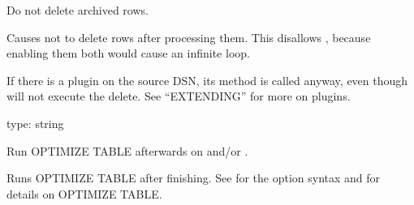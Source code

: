 \documentclass[letterpaper,10pt,english]{sphinxmanual}
\begin{document}

\begin{fulllineitems}
\label{\detokenize{mariadb-archiver:cmdoption-mariadb-archiver-no-delete}}
Do not delete archived rows.

Causes  not to delete rows after processing them.  This disallows
{\hyperref[\detokenize{mariadb-archiver:cmdoption-mariadb-archiver-no-ascend}]{}}, because enabling them both would cause an infinite loop.

If there is a plugin on the source DSN, its  method is called
anyway, even though  will not execute the delete.  See
“EXTENDING” for more on plugins.

\end{fulllineitems}


\begin{fulllineitems}
\label{\detokenize{mariadb-archiver:cmdoption-mariadb-archiver-optimize}}
type: string

Run OPTIMIZE TABLE afterwards on {\hyperref[\detokenize{mariadb-archiver:cmdoption-mariadb-archiver-source}]{}} and/or {\hyperref[\detokenize{mariadb-archiver:cmdoption-mariadb-archiver-dest}]{}}.

Runs OPTIMIZE TABLE after finishing.  See {\hyperref[\detokenize{mariadb-archiver:cmdoption-mariadb-archiver-analyze}]{}} for the option syntax
and  for details on OPTIMIZE
TABLE.

\end{fulllineitems}
\end{document}
